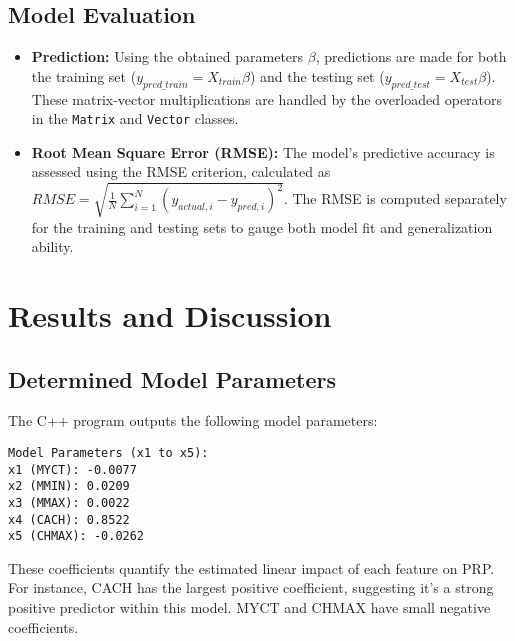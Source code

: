 \subsection{Model Evaluation}
\begin{itemize}
    \item \textbf{Prediction:} Using the obtained parameters $\beta$, predictions are made for both the training set ($y_{pred\_train} = X_{train} \beta$) and the testing set ($y_{pred\_test} = X_{test} \beta$). These matrix-vector multiplications are handled by the overloaded operators in the \texttt{Matrix} and \texttt{Vector} classes.
    \item \textbf{Root Mean Square Error (RMSE):} The model's predictive accuracy is assessed using the RMSE criterion, calculated as $ RMSE = \sqrt{\frac{1}{N} \sum_{i=1}^{N} (y_{actual,i} - y_{pred,i})^2} $. The RMSE is computed separately for the training and testing sets to gauge both model fit and generalization ability.
\end{itemize}

\section{Results and Discussion}
\label{sec:results_partb_discussion} %

\begin{figure}[H]

\end{figure}

\subsection{Determined Model Parameters}
The C++ program outputs the following model parameters:
\begin{verbatim}
Model Parameters (x1 to x5):
x1 (MYCT): -0.0077
x2 (MMIN): 0.0209
x3 (MMAX): 0.0022
x4 (CACH): 0.8522
x5 (CHMAX): -0.0262
\end{verbatim}
These coefficients quantify the estimated linear impact of each feature on PRP. For instance, CACH has the largest positive coefficient, suggesting it's a strong positive predictor within this model. MYCT and CHMAX have small negative coefficients.


